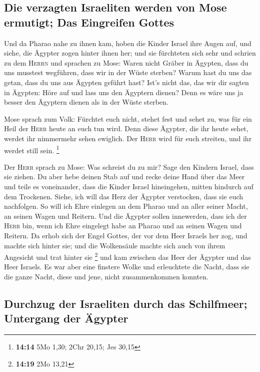 \hypertarget{die-verzagten-israeliten-werden-von-mose-ermutigt-das-eingreifen-gottes}{%
\subsection{Die verzagten Israeliten werden von Mose ermutigt; Das
Eingreifen
Gottes}\label{die-verzagten-israeliten-werden-von-mose-ermutigt-das-eingreifen-gottes}}

 Und da Pharao nahe zu ihnen kam, hoben die Kinder Israel
ihre Augen auf, und siehe, die Ägypter zogen hinter ihnen her; und sie
fürchteten sich sehr und schrien zu dem \textsc{Herrn} 
und sprachen zu Mose: Waren nicht Gräber in Ägypten, dass du uns
musstest wegführen, dass wir in der Wüste sterben? Warum hast du uns das
getan, dass du uns aus Ägypten geführt hast?  Ist's nicht
das, das wir dir sagten in Ägypten: Höre auf und lass uns den Ägyptern
dienen? Denn es wäre uns ja besser den Ägyptern dienen als in der Wüste
sterben.

 Mose sprach zum Volk: Fürchtet euch nicht, stehet fest
und sehet zu, was für ein Heil der \textsc{Herr} heute an euch tun wird.
Denn diese Ägypter, die ihr heute sehet, werdet ihr nimmermehr sehen
ewiglich.  Der \textsc{Herr} wird für euch streiten, und
ihr werdet still sein. \footnote{\textbf{14:14} 5Mo 1,30; 2Chr 20,15;
  Jes 30,15}

 Der \textsc{Herr} sprach zu Mose: Was schreist du zu
mir? Sage den Kindern Israel, dass sie ziehen.  Du aber
hebe deinen Stab auf und recke deine Hand über das Meer und teile es
voneinander, dass die Kinder Israel hineingehen, mitten hindurch auf dem
Trockenen.  Siehe, ich will das Herz der Ägypter
verstocken, dass sie euch nachfolgen. So will ich Ehre einlegen an dem
Pharao und an aller seiner Macht, an seinen Wagen und Reitern.
 Und die Ägypter sollen innewerden, dass ich der
\textsc{Herr} bin, wenn ich Ehre eingelegt habe an Pharao und an seinen
Wagen und Reitern.  Da erhob sich der Engel Gottes, der
vor dem Heer Israels her zog, und machte sich hinter sie; und die
Wolkensäule machte sich auch von ihrem Angesicht und trat hinter sie
\footnote{\textbf{14:19} 2Mo 13,21}  und kam zwischen das
Heer der Ägypter und das Heer Israels. Es war aber eine finstere Wolke
und erleuchtete die Nacht, dass sie die ganze Nacht, diese und jene,
nicht zusammenkommen konnten.

\hypertarget{durchzug-der-israeliten-durch-das-schilfmeer-untergang-der-uxe4gypter}{%
\subsection{Durchzug der Israeliten durch das Schilfmeer; Untergang der
Ägypter}\label{durchzug-der-israeliten-durch-das-schilfmeer-untergang-der-uxe4gypter}}


